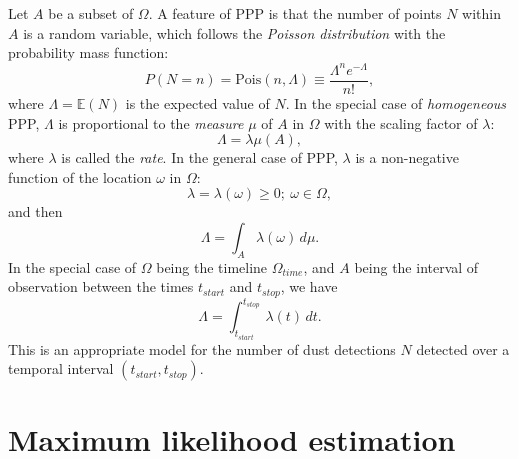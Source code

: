 Let $A$ be a subset of $\Omega$. A feature of PPP is that the number of points $N$ within $A$ is a random variable, which follows the \textit{Poisson distribution} with the probability mass function:
\begin{equation}
    P(N=n) = \mathrm{Pois}(n,\Lambda) \equiv \frac{\Lambda^n e^{-\Lambda}}{n!}, \label{eq:poisson_pmf}
\end{equation}
where $\Lambda = \mathbb{E}(N)$ is the expected value of $N$. In the special case of \textit{homogeneous} PPP, $\Lambda$ is proportional to the \textit{measure} $\mu$ of $A$ in $\Omega$ with the scaling factor of $\lambda$:
\begin{equation}
    \Lambda = \lambda \mu(A),
\end{equation}
where $\lambda$ is called the \textit{rate}. In the general case of PPP, $\lambda$ is a non-negative function of the location $\omega$ in $\Omega$:
\begin{equation}
    \lambda = \lambda(\omega) \geq 0; \ \omega \in \Omega,
\end{equation}
and then 
\begin{equation}
    \Lambda = \int_A \lambda(\omega) \, d\mu.
\end{equation}
In the special case of $\Omega$ being the timeline $\Omega_{time}$, and $A$ being the interval of observation between the times $t_{start}$ and $t_{stop}$, we have
\begin{equation}
    \Lambda = \int_{t_{start}}^{t_{stop}} \lambda(t) \, dt.
\end{equation}
This is an appropriate model for the number of dust detections $N$ detected over a temporal interval $(t_{start},t_{stop})$.

\section{Maximum likelihood estimation} \label{ch:mle}

